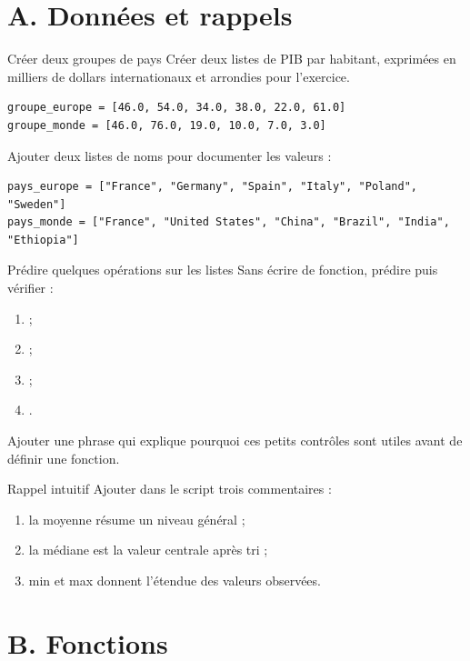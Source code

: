 \documentclass[11pt,a4paper]{article}
\begin{document}
\section*{A. Données et rappels}

\begin{mandatoryexercise}{Créer deux groupes de pays}
Créer deux listes de PIB par habitant, exprimées en milliers de dollars internationaux et arrondies pour l'exercice.
\begin{lstlisting}
groupe_europe = [46.0, 54.0, 34.0, 38.0, 22.0, 61.0]
groupe_monde = [46.0, 76.0, 19.0, 10.0, 7.0, 3.0]
\end{lstlisting}
Ajouter deux listes de noms pour documenter les valeurs :
\begin{lstlisting}
pays_europe = ["France", "Germany", "Spain", "Italy", "Poland", "Sweden"]
pays_monde = ["France", "United States", "China", "Brazil", "India", "Ethiopia"]
\end{lstlisting}
\end{mandatoryexercise}

\begin{mandatoryexercise}{Prédire quelques opérations sur les listes}
Sans écrire de fonction, prédire puis vérifier :
\begin{enumerate}
  \item {} ;
  \item {} ;
  \item {} ;
  \item {}.
\end{enumerate}
Ajouter une phrase qui explique pourquoi ces petits contrôles sont utiles avant de définir une fonction.
\end{mandatoryexercise}

\begin{mandatoryexercise}{Rappel intuitif}
Ajouter dans le script trois commentaires :
\begin{enumerate}
  \item la moyenne résume un niveau général ;
  \item la médiane est la valeur centrale après tri ;
  \item min et max donnent l'étendue des valeurs observées.
\end{enumerate}
\end{mandatoryexercise}

\section*{B. Fonctions}
\end{document}
